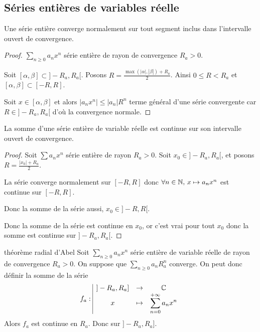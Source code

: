 \subsection{Séries entières de variables réelle }

\begin{theoreme}{}{}
    Une série entière converge normalement sur tout segment inclus dans l'intervalle ouvert de 
    convergence. 
\end{theoreme}

\begin{proof}
    $\sum_{n \geqslant 0 } a_n x^n$ série entière de rayon de convergence $R_a > 0$.

    Soit $[\alpha, \beta] \subset ]-R_a, R_a[$. Posons $R = \frac{\max(|\alpha|, |\beta|) + R_a}{2}$.
    Ainsi $0 \leqslant R < R_a$ et $[\alpha, \beta] \subset [-R, R]$. 

    Soit $x \in [\alpha, \beta]$ et alors 
    $|a_n x^n| \leqslant |a_n| R^n$ terme général d'une série convergente car 
    $R \in ]- R_a, R_a[$ d'où la convergence normale. 
\end{proof}

\begin{corollaire}{}{}
    La somme d'une série entière de variable réelle est continue sur son intervalle 
    ouvert de convergence.
\end{corollaire}

\begin{proof}
    Soit $\sum a_n x^n$ série entière de rayon $R_a > 0$. Soit $x_0 \in ]-R_a, R_a[$, et posons 
    $R = \frac{|x_0| + R_a}{2}$. 

    La série converge normalement sur $[-R, R]$ donc $\forall n \in \mathbb{N}, \, x \mapsto a_n x^n$ 
    est continue sur $[-R, R]$. 

    Donc la somme de la série aussi, $x_0 \in ]-R, R[$.

    Donc la somme de la série est continue en $x_0$, or c'est vrai pour tout 
    $x_0$ donc la somme est continue sur $]-R_a, R_a[$.
\end{proof}

\begin{theoreme}{théorème radial d'Abel}{}
    Soit $\sum_{n \geqslant 0} a_n x^n$ série entière de variable réelle de rayon de convergence $R_a > 0$.
    On suppose que $\sum_{n \geqslant 0} a_n R_a^n$ converge. 
    On peut donc définir la somme de la série 
    $$f_a: \space \begin{array}{|ccc} \displaystyle ]-R_a, R_a] & \to & \displaystyle \mathbb{C} \\ \displaystyle x & \mapsto & \displaystyle \sum_{n = 0}^{+\infty} a_n x^n \end{array}$$
    Alors $f_a$ est continue en $R_a$. Donc sur $]-R_a, R_a]$.
\end{theoreme}

